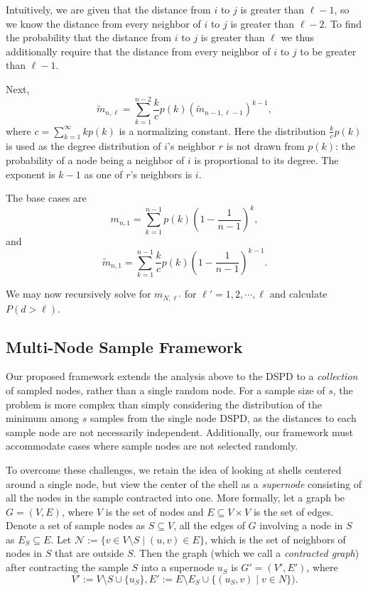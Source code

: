Intuitively, we are given that the distance from $i$ to $j$ is greater than $\ell-1$, so we know the distance from every neighbor of $i$ to $j$ is greater than $\ell-2$. To find the probability that the distance from $i$ to $j$ is greater than $\ell$ we thus additionally require that the distance from every neighbor of $i$ to $j$ to be greater than $\ell-1$.

Next,
\[\tilde{m}_{n, \ell} = \sum_{k=1}^{n-2} \frac{k}{c} p(k) (\tilde{m}_{n-1, \ell-1})^{k-1},\]
where $c = \sum_{k=1}^\infty kp(k)$ is a normalizing constant. Here the distribution $\frac{k}{c} p(k)$ is used as the degree distribution of $i$'s neighbor $r$ is not drawn from $p(k)$: the probability of a node being a neighbor of $i$ is proportional to its degree. The exponent is $k-1$ as one of $r$'s neighbors is $i$.

The base cases are
\[m_{n,1} = \sum_{k=1}^{n-1} p(k) \left(1 - \frac{1}{n-1}\right)^k,\]
and
\[\tilde{m}_{n,1} = \sum_{k=1}^{n-1} \frac{k}{c}p(k) \left(1 - \frac{1}{n-1}\right)^{k-1}.\]

We may now recursively solve for $m_{N,\ell'}$ for $\ell' = 1,2,\cdots,\ell$ and calculate $P(d > \ell)$.

\subsection{Multi-Node Sample Framework}

Our proposed framework extends the analysis above to the DSPD to a \emph{collection} of sampled nodes, rather than a single random node. For a sample size of $s$, the problem is more complex than simply considering the distribution of the minimum among $s$ samples from the single node DSPD, as the distances to each sample node are not necessarily independent. Additionally, our framework must accommodate cases where sample nodes are not selected randomly.

To overcome these challenges, we retain the idea of looking at shells centered around a single node, but view the center of the shell as a \textit{supernode} consisting of all the nodes in the sample contracted into one. More formally, let a graph be $G = (V, E)$, where $V$ is the set of nodes and $E\subseteq V\times V$ is the set of edges. Denote a set of sample nodes as $S\subseteq V$, all the edges of $G$ involving a node in $S$ as $E_S \subseteq E$. Let $\mathcal{N} := \{v\in V\setminus S \mid (u, v) \in E\}$, which is the set of neighbors of nodes in $S$ that are outside $S$. Then the graph (which we call a \textit{contracted graph}) after contracting the sample $S$ into a supernode $u_S$ is $G' = (V', E')$, where 
\[V' := V \setminus S \cup \{u_S\}, E' := E \setminus E_S \cup \{(u_S, v) \mid v\in N\}).\]

